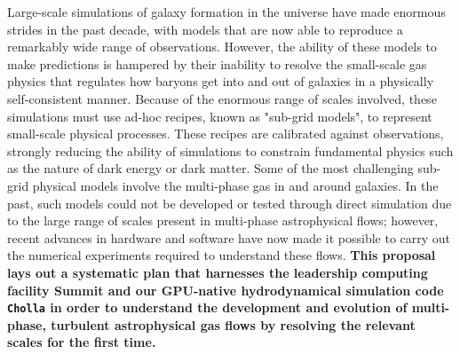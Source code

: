 \documentclass[11pt,letterpaper,english]{article}
\begin{document}






Large-scale simulations of galaxy formation in the universe have made enormous strides in the past decade, with models that are now able to reproduce a remarkably wide range of observations.  However, the ability of these models to make predictions is hampered by their inability to resolve the small-scale gas physics that regulates how baryons get into and out of galaxies in a physically self-consistent manner. Because of the enormous range of scales involved, these simulations must use ad-hoc recipes, known as "sub-grid models", to represent small-scale physical processes. These recipes are calibrated against observations, strongly reducing the ability of simulations to constrain fundamental physics such as the nature of dark energy or dark matter. Some of the most challenging sub-grid physical models involve the multi-phase gas in and around galaxies. In the past, such models could not be developed or tested through direct simulation due to the large range of scales present in multi-phase astrophysical flows; however, recent advances in hardware and software have now made it possible to carry out the numerical experiments required to understand these flows. {\bf This proposal lays out a systematic plan that harnesses the leadership computing facility Summit and our GPU-native hydrodynamical simulation code {\tt Cholla} \cite{Schneider15} in order to understand the development and evolution of multi-phase, turbulent astrophysical gas flows by resolving the relevant scales for the first time.}
\end{document}
